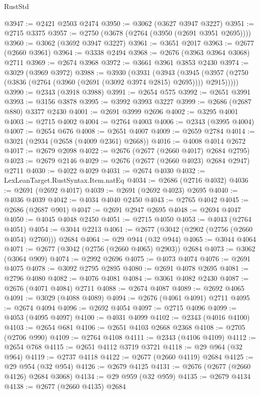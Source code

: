 \begin{lexlean}{RustStd}
\begin{coremodule}
@3947 := @2421 @2503 @2474
@3950 := @3062 (@3627 @3947 @3227)
@3951 := @2715 @3375
@3957 := @2750 (@3678 (@2764 (@3950 (@2691 @3951 @2695))))
@3960 := @3062 (@3692 @3947 @3227)
@3961 := @3651 @2017
@3963 := @2677 (@2660 @3961)
@3964 := @3338 @2494
@3968 := @2676 (@3963 @3964 @3068) @2711
@3969 := @2674 @3968
@3972 := @3661 @3961 @3853 @2430
@3974 := @3029 (@3969 @3972)
@3988 := @3930
    (@3931
      (@3943
        (@3945 (@3957 (@2750 (@3836 (@2764 (@3960 (@2691 (@3092 @3974 @2815) @2695)))) @2915)))))
@3990 := @2343 (@3918 @3988)
@3991 := @2654 @575
@3992 := @2651 @3991
@3993 := @3156 @3878
@3995 := @3992 @3993 @3227
@3999 := @2686 (@2687 @880) @3377 @2430
@4001 := @2691 @3999 @2696
@4002 := @3295 @4001
@4003 := @2715 @4002
@4004 := @2764 @4003
@4006 := @2343 (@3995 @4004)
@4007 := @2654 @676
@4008 := @2651 @4007
@4009 := @2659 @2784
@4014 := @3021 (@2934 (@2658 (@4009 @2361) @2668))
@4016 := @4008 @4014 @2672
@4017 := @2679 @2098
@4022 := @2676 (@2677 (@2660 @4017) @2684 @2795)
@4023 := @2679 @2146
@4029 := @2676 (@2677 (@2660 @4023) @2684 @2947) @2711
@4030 := @4022 @4029
@4031 := @2674 @4030
@4032 := LexLeanTarget.RustSyntax.Item.natEq
@4034 := @2686 (@2716 @4032)
@4036 := @2691 (@2692 @4017)
@4039 := @2691 (@2692 @4023) @2695
@4040 := @4036 @4039
@4042 := @4034 @4040 @2450
@4043 := @2765 @4042
@4045 := @2686 (@2687 @901)
@4047 := @2691 @2947 @2695
@4048 := @2694 @4047
@4050 := @4045 @4048 @2450
@4051 := @2715 @4050
@4053 := @4043 (@2764 @4051)
@4054 := @3044 @2213
@4061 := @2677 (@3042 (@2902 (@2756 (@2660 @4054) @2760))) @2684
@4064 := @29 @944 (@32 @944)
@4065 := @3044 @4064
@4071 := @2677 (@3042 (@2756 (@2660 @4065) @2903)) @2684
@4073 := @3062 (@3064 @909)
@4074 := @2992 @2696
@4075 := @4073 @4074
@4076 := @2691 @4075
@4078 := @3092 @2795 @2895
@4080 := @2691 @4078 @2695
@4081 := @2796 @4080
@4082 := @4076 @4081
@4084 := @3061 @4082 @2430
@4087 := @2676 (@4071 @4084) @2711
@4088 := @2674 @4087
@4089 := @2692 @4065
@4091 := @3029 (@4088 @4089)
@4094 := @2676 (@4061 @4091) @2711
@4095 := @2674 @4094
@4096 := @2692 @4054
@4097 := @2715 @4096
@4099 := @4053 (@4095 @4097)
@4100 := @4031 @4099
@4102 := @2343 (@4016 @4100)
@4103 := @2654 @681
@4106 := @2651 @4103 @2668 @2368
@4108 := @2705 (@2706 @990)
@4109 := @2764 @4108
@4111 := @2343 (@4106 @4109)
@4112 := @2654 @768
@4115 := @2651 @4112 @3719 @3721
@4118 := @29 @964 (@32 @964)
@4119 := @2737 @4118
@4122 := @2677 (@2660 @4119) @2684
@4125 := @29 @954 (@32 @954)
@4126 := @2679 @4125
@4131 := @2676 (@2677 (@2660 @4126) @2684 @3068)
@4134 := @29 @959 (@32 @959)
@4135 := @2679 @4134
@4138 := @2677 (@2660 @4135) @2684

\end{coremodule}
\end{lexlean}
